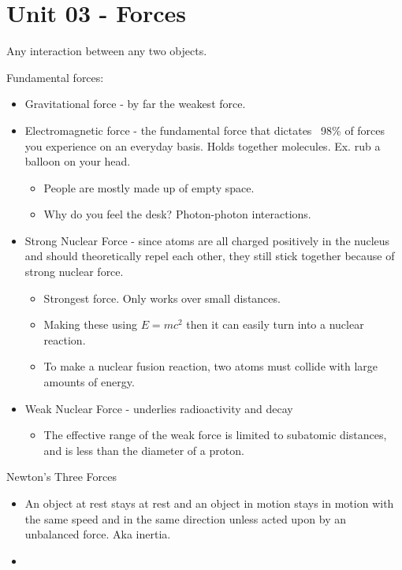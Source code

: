 \documentclass{scrreprt} %
\begin{document}
\section{Unit 03 - Forces}

\begin{definition}[Force]
	Any interaction between any two objects.
\end{definition}

\begin{definition}
	Fundamental forces:

	\begin{itemize}
		\item Gravitational force - by far the weakest force.
		\item Electromagnetic force - the fundamental force that dictates ~98\%
		of forces you experience on an everyday basis. Holds together molecules.
		Ex. rub a balloon on your head.
		\begin{itemize}
			\item People are mostly made up of empty space.
			\item Why do you feel the desk? Photon-photon interactions.
		\end{itemize}
		\item Strong Nuclear Force - since atoms are all charged positively
		in the nucleus and should theoretically repel each other, they still stick
		together because of strong nuclear force.
		\begin{itemize}
			\item Strongest force. Only works over small distances.
			\item Making these using $E=mc^2$ then it can
			easily turn into a nuclear reaction.
			\item To make a nuclear fusion reaction, two atoms must collide with large amounts
			of energy. 
		\end{itemize}
		\item Weak Nuclear Force - underlies radioactivity and decay
		\begin{itemize}
			\item The effective range of the weak force is limited to subatomic
			distances, and is less than the diameter of a proton.
		\end{itemize}
	\end{itemize}
\end{definition}

Newton's Three Forces

\begin{itemize}
	\item An object at rest stays at rest and an object in motion stays in
	motion with the same speed and in the same direction unless acted upon by an
	unbalanced force. Aka inertia.
	\item 
\end{itemize}
\end{document}
